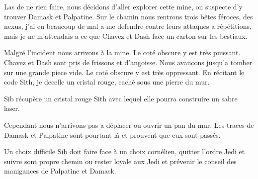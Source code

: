\documentclass[10pt,a4paper,twoside,twocolumn,openany]{book}
\begin{document}
Las de ne rien faire, nous décidons d'aller explorer cette mine, on suspecte
d'y trouver Damask et Palpatine. Sur le chamin nous rentrons trois bêtes féroces,
des nexus, j'ai eu beaucoup de mal a me defendre contre leurs attaques a répétitions,
mais je ne m'attendais a ce que Chavez et Dash face un carton sur les bestiaux.

Malgré l'incident nous arrivons à la mine. Le coté obscure y est très puissant. 
Chavez et Dash sont pris de frissons et d'angoisse. Nous avancons jusqu'a tomber
sur une grande piece vide. Le coté obscure y est très oppressant. En récitant
le code Sith, je decelle un cristal rouge, caché sous une pierre du mur.

\begin{quotebox}
Sib récupère un cristal rouge Sith avec lequel elle pourra construire un sabre
laser.
\end{quotebox}

Cependant nous n'arrivons pas a déplacer ou ouvrir un pan du mur.
Les traces de Damask et Palpatine sont pourtant là et prouvent que eux sont passés. 

\begin{paperbox}{Un choix difficile}
Sib doit faire face à un choix cornélien, quitter l'ordre Jedi et suivre sont propre
chemin ou rester loyale aux Jedi et prévenir le conseil des manigances de Palpatine et
Damask.  
\end{paperbox}
\end{document}
